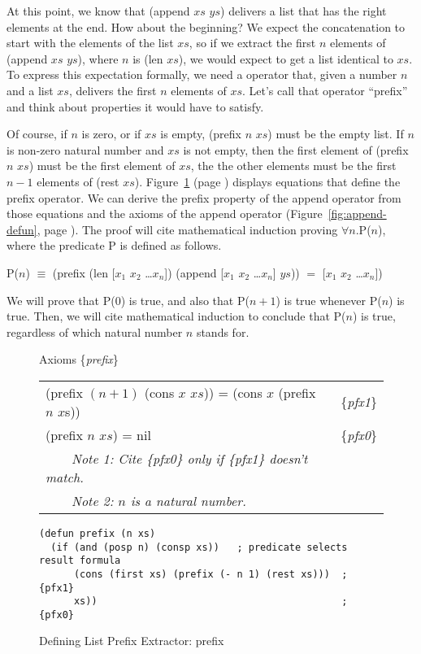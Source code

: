 At this point, we know that (append $xs$ $ys$) delivers
a list that has the right elements at the end.
How about the beginning?
We expect the concatenation to start with the elements of the list $xs$,
so if we extract the first $n$ elements of (append $xs$ $ys$), where $n$ is (len $xs$),
we would expect to get a list identical to $xs$.
To express this expectation formally, we need a operator that,
given a number $n$ and a list $xs$, delivers the first $n$ elements of $xs$.
Let's call that operator ``prefix'' and think about properties it would have to satisfy.

Of course, if $n$ is zero, or if $xs$ is empty,
(prefix $n$ $xs$) must be the empty list.
If $n$ is non-zero natural number and $xs$ is not empty,
then the first element of (prefix $n$ $xs$) must be the first element of $xs$,
the the other elements must be the first $n-1$ elements of (rest $xs$).
Figure~\ref{prefix-equations} (page \pageref{prefix-equations}) displays
equations that define the prefix operator.
We can derive the prefix property of the append operator
from those equations and the axioms of the append operator
(Figure~\ref{fig:append-defun}, page \pageref{fig:append-defun}).
The proof will cite mathematical induction proving $\forall n.$P($n$),
where the predicate P is defined as follows.

\begin{samepage}
\begin{center}
P($n$) $\equiv$ (prefix (len [$x_1$ $x_2$ \dots $x_n$]) (append [$x_1$ $x_2$ \dots $x_n$] $ys$))
                $=$ [$x_1$ $x_2$ \dots $x_n$])
\end{center}
\end{samepage}

We will prove that P(0) is true, and also that P($n+1$) is true whenever P($n$) is true. Then, we will cite mathematical induction to conclude that P($n$) is true, regardless of which natural number $n$ stands for.

\begin{figure}
\begin{center}
Axioms \{\emph{prefix}\}                                           \\
\begin{tabular}{ll}
(prefix $(n + 1)$ (cons $x$ $xs$)) = (cons $x$ (prefix $n$ $x$s)) & \{\emph{pfx1}\} \\
(prefix $n$ $xs$) =  nil                                          & \{\emph{pfx0}\} \\
~~~~\emph{Note 1: Cite \{\emph{pfx0}\} only if \{\emph{pfx1}\} doesn't match.}&\\
~~~~\emph{Note 2: $n$ is a natural number.}
\end{tabular}
\begin{Verbatim}
(defun prefix (n xs)
  (if (and (posp n) (consp xs))   ; predicate selects result formula
      (cons (first xs) (prefix (- n 1) (rest xs)))  ; {pfx1}
      xs))                                          ; {pfx0}
\end{Verbatim}
\end{center}
\caption{Defining List Prefix Extractor: prefix}
\label{prefix-equations}
\end{figure}

